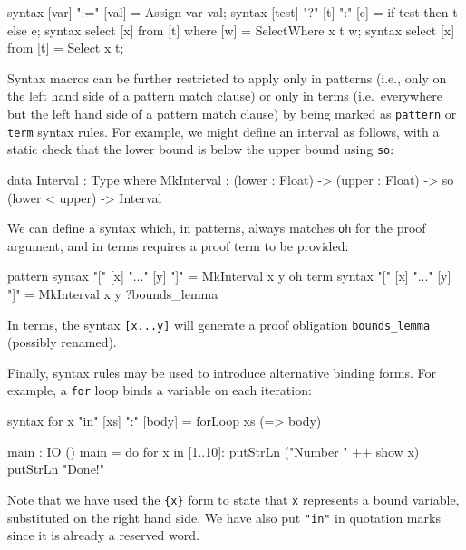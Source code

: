 \begin{code}
syntax [var] ":=" [val]              = Assign var val;
syntax [test] "?" [t] ":" [e]        = if test then t else e;
syntax select [x] from [t] where [w] = SelectWhere x t w;
syntax select [x] from [t]           = Select x t;
\end{code}

\noindent
Syntax macros can be further restricted to apply only in patterns (i.e., only on the left hand side of a pattern match clause) or only in terms (i.e.\ everywhere but the left hand side of a pattern match clause) by being marked as \texttt{pattern} or \texttt{term} syntax rules.
For example, we might define an interval as follows, with a static check that the lower bound is below the upper bound using \texttt{so}:

\begin{code}
data Interval : Type where
   MkInterval : (lower : Float) -> (upper : Float) -> 
                so (lower < upper) -> Interval
\end{code}

\noindent
We can define a syntax which, in patterns, always matches \texttt{oh} for the proof  argument, and in terms requires a proof term to be provided:

\begin{code}
pattern syntax "[" [x] "..." [y] "]" = MkInterval x y oh
term    syntax "[" [x] "..." [y] "]" = MkInterval x y ?bounds_lemma
\end{code} 

\noindent
In terms, the syntax \texttt{[x...y]} will generate a proof obligation \texttt{bounds\_lemma} (possibly renamed).

Finally, syntax rules may be used to introduce alternative binding forms.
For example, a \texttt{for} loop binds a variable on each iteration:

\begin{code}
syntax for {x} "in" [xs] ":" [body] = forLoop xs (\x => body)
  
main : IO ()
main = do for x in [1..10]:
              putStrLn ("Number " ++ show x)
          putStrLn "Done!"
\end{code} 

\noindent
Note that we have used the \texttt{\{x\}} form to state that \texttt{x} represents a bound variable, substituted on the right hand side.
We have also put \texttt{"in"} in quotation marks since it is already a reserved word.

